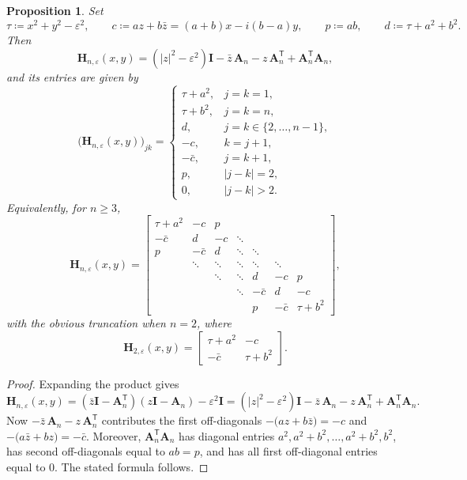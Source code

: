 \documentclass[11pt]{article}
\newtheorem{proposition}[theorem]{Proposition}
\begin{document}
\begin{proposition}\label{prop:explicit-H}
Set
\[
\tau\coloneqq x^2+y^2-\varepsilon^2,
\qquad
c\coloneqq az+b\bar z=(a+b)x-i(b-a)y,
\qquad
p\coloneqq ab,
\qquad
d\coloneqq \tau+a^2+b^2.
\]
Then
\[
\mathbf{H}_{n,\varepsilon}(x,y)
=(|z|^2-\varepsilon^2)\mathbf{I}-\bar z\,\mathbf{A}_n-z\,\mathbf{A}_n^{\mathsf{T}}+\mathbf{A}_n^{\mathsf{T}}\mathbf{A}_n,
\]
and its entries are given by
\[
\bigl(\mathbf{H}_{n,\varepsilon}(x,y)\bigr)_{jk}
=
\begin{cases}
\tau+a^2, & j=k=1,\\
\tau+b^2, & j=k=n,\\
d, & j=k\in\{2,\dots,n-1\},\\
-c, & k=j+1,\\
-\bar c, & j=k+1,\\
p, & |j-k|=2,\\
0, & |j-k|>2.
\end{cases}
\]
Equivalently, for \(n\ge 3\),
\[
\mathbf{H}_{n,\varepsilon}(x,y)=
\begin{bmatrix}
\tau+a^2 & -c & p \\
-\bar c & d & -c & \ddots \\
p & -\bar c & d & \ddots & \ddots \\
& \ddots & \ddots & \ddots & \ddots & \ddots \\
&& \ddots & \ddots & d & -c & p \\
&&& \ddots & -\bar c & d & -c \\
&&&& p & -\bar c & \tau+b^2
\end{bmatrix},
\]
with the obvious truncation when \(n=2\), where
\[
\mathbf{H}_{2,\varepsilon}(x,y)=
\begin{bmatrix}
\tau+a^2 & -c \\
-\bar c & \tau+b^2
\end{bmatrix}.
\]
\end{proposition}

\begin{proof}
Expanding the product gives
\[
\mathbf{H}_{n,\varepsilon}(x,y)
=(\bar z\mathbf{I}-\mathbf{A}_n^{\mathsf{T}})(z\mathbf{I}-\mathbf{A}_n)-\varepsilon^2\mathbf{I}
=(|z|^2-\varepsilon^2)\mathbf{I}-\bar z\,\mathbf{A}_n-z\,\mathbf{A}_n^{\mathsf{T}}+\mathbf{A}_n^{\mathsf{T}}\mathbf{A}_n.
\]
Now \(-\bar z\,\mathbf{A}_n-z\,\mathbf{A}_n^{\mathsf{T}}\) contributes the first off-diagonals
\(-\bigl(az+b\bar z\bigr)=-c\) and \(-\bigl(a\bar z+bz\bigr)=-\bar c\).
Moreover, \(\mathbf{A}_n^{\mathsf{T}}\mathbf{A}_n\) has diagonal entries
\(a^2,a^2+b^2,\dots,a^2+b^2,b^2\), has second off-diagonals equal to \(ab=p\),
and has all first off-diagonal entries equal to \(0\). The stated formula follows.
\end{proof}
\end{document}
